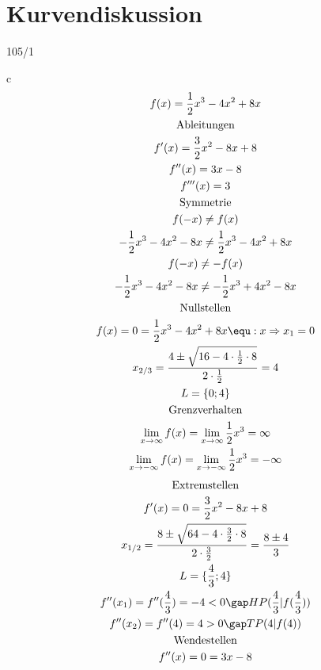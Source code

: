 \section{Kurvendiskussion}
\begin{exercise}{105/1}
  \item [c]
  \begin{gather*}
    f(x) = \frac{1}{2}x^3 - 4x^2 + 8x \\
    \text{Ableitungen} \\
    f'(x) = \frac{3}{2}x^2 - 8x + 8 \\
    f''(x) = 3x - 8 \\
    f'''(x) = 3 \\
    \text{Symmetrie} \\
    f(-x) \neq f(x) \\
    -\frac{1}{2}x^3 - 4x^2 - 8x \neq \frac{1}{2}x^3 - 4x^2 + 8x \\
    f(-x) \neq -f(x) \\
    -\frac{1}{2}x^3 - 4x^2 - 8x \neq -\frac{1}{2}x^3 + 4x^2 - 8x \\
    \text{Nullstellen} \\
    f(x) = 0 = \frac{1}{2}x^3 - 4x^2 + 8x \equ :x \Rightarrow x_1 = 0 \\
    x_{2/3} = \frac{4 \pm \sqrt{16 - 4 \cdot \frac{1}{2} \cdot 8}}{2 \cdot \frac{1}{2}} = 4 \\
    L = \{0; 4\} \\
    \text{Grenzverhalten} \\
    \lim\limits_{x \to \infty} f(x) = \lim\limits_{x \to \infty} \frac{1}{2}x^3 = \infty \\
    \lim\limits_{x \to -\infty} f(x) = \lim\limits_{x \to -\infty} \frac{1}{2}x^3 = -\infty \\
  \end{gather*}
  \begin{gather*}
    \text{Extremstellen} \\
    f'(x) = 0 = \frac{3}{2}x^2 - 8x + 8 \\
    x_{1/2} = \frac{8 \pm \sqrt{64 - 4 \cdot \frac{3}{2} \cdot 8}}{2 \cdot \frac{3}{2}} = \frac{8 \pm 4}{3} \\
    L = \{\frac{4}{3}; 4\} \\
    f''(x_1) = f''(\frac{4}{3}) = -4 < 0 \gap HP(\frac{4}{3}|f(\frac{4}{3})) \\
    f''(x_2) = f''(4) = 4 > 0 \gap TP(4|f(4)) \\
    \text{Wendestellen} \\
    f''(x) = 0 = 3x - 8 \\

\end{gather*}
\end{exercise}
